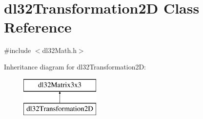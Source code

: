 \hypertarget{classdl32_transformation2_d}{\section{dl32\-Transformation2\-D Class Reference}
\label{classdl32_transformation2_d}
}


{\ttfamily \#include $<$dl32\-Math.\-h$>$}

Inheritance diagram for dl32\-Transformation2\-D\-:\begin{figure}[H]
\begin{center}
\leavevmode
\includegraphics[height=2.000000cm]{classdl32_transformation2_d}
\end{center}
\end{figure}
